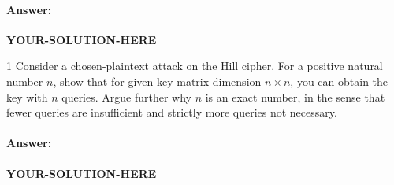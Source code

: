 \documentclass[]{scrartcl}
\newcounter{exercise}
\newcounter{qid}[section]
\newcommand{\exerciseprefix}{prefix}
\newcommand{\questiontitle}{Questions}
\newcommand{\blockid}{B3}
\newcommand{\exname}{}
\newcommand{\yoursolutionhere}{\textbf{YOUR-SOLUTION-HERE}}
\begin{document}
\paragraph{Answer:} \yoursolutionhere{}


\renewcommand{\exerciseprefix}{PS-\blockid{}-E\theexercise: \exname-Q\theqid}
\renewcommand{\questiontitle}{\exerciseprefix{}: Chosen-plaintext attack}
\begin{exercisebox}{1}
Consider a chosen-plaintext attack on the Hill cipher. For a positive natural number $n$, show that for given key matrix dimension $n \times n$, you can obtain the key with $n$ queries. Argue further why $n$ is an exact number, in the sense that fewer queries are insufficient and strictly more queries not necessary. 

\end{exercisebox}

\paragraph{Answer:} \yoursolutionhere{}


\pagebreak
{}
\renewcommand{\exname}{Vigen\`ere Cipher}
\end{document}
